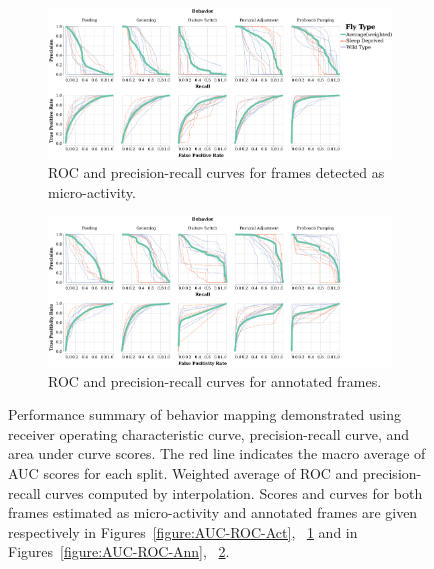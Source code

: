 \begin{figure}[h]
	\begin{subfigure}[b]{0.95\linewidth}
		\centering\includegraphics[width=\linewidth]{figures/PRC_ROC-DActfiltered.pdf}
		\caption{ROC and precision-recall curves for frames detected as micro-activity. \label{figure:ROC-PRC-Act}}
	\end{subfigure}%

	\begin{subfigure}[b]{0.95\linewidth}
		\centering\includegraphics[width=\linewidth]{figures/PRC_ROC-DAnnfiltered.pdf}
		\caption{ROC and precision-recall curves for annotated frames. \label{figure:ROC-PRC-Ann}}
	\end{subfigure}%
	\caption[Performance summary of behavior mapping demonstrated using receiver operating characteristic curve, precision-recall curve, and area under curve scores.
	]{Performance summary of behavior mapping demonstrated using receiver operating characteristic curve, precision-recall curve, and area under curve scores.
		The red line indicates the macro average of AUC scores for each split.
		Weighted average of ROC and precision-recall curves computed by interpolation.
		Scores and curves for both frames estimated as micro-activity and annotated frames are given respectively in Figures~\ref{figure:AUC-ROC-Act}, ~\ref{figure:ROC-PRC-Act} and in Figures~\ref{figure:AUC-ROC-Ann}, ~\ref{figure:ROC-PRC-Ann}. \label{figure:ROC-PRC-AUC}}
\end{figure}

